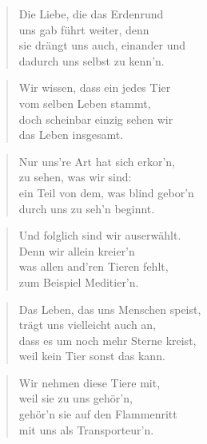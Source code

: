\documentclass[10pt,a4paper]{article}
\begin{document}
\begin{multicols}{2}
\begin{verse}
Die Liebe, die das Erdenrund \\
uns gab führt weiter, denn \\
sie drängt uns auch, einander und \\
dadurch uns selbst zu kenn’n. \\
\end{verse}

\begin{verse}
Wir wissen, dass ein jedes Tier \\
vom selben Leben stammt, \\
doch scheinbar einzig sehen wir \\
das Leben insgesamt. \\
\end{verse}

\begin{verse}
Nur uns’re Art hat sich erkor’n, \\
zu sehen, was wir sind: \\
ein Teil von dem, was blind gebor’n \\
durch uns zu seh’n beginnt. \\
\end{verse}

\begin{verse}
Und folglich sind wir auserwählt. \\
Denn wir allein kreier’n \\
was allen and’ren Tieren fehlt, \\
zum Beispiel Meditier’n. \\
\end{verse}

\begin{verse}
Das Leben, das uns Menschen speist, \\
trägt uns vielleicht auch an, \\
dass es um noch mehr Sterne kreist, \\
weil kein Tier sonst das kann. \\
\end{verse}

\begin{verse}
Wir nehmen diese Tiere mit, \\
weil sie zu uns gehör’n, \\
gehör’n sie auf den Flammenritt \\
mit uns als Transporteur’n. \\
\end{verse}


\end{multicols}
\end{document}
